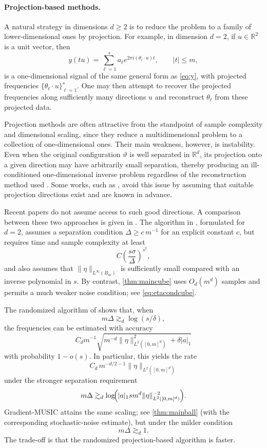 \documentclass[11pt]{article}
\theoremstyle{definition}
\numberwithin{theorem}{section}
\numberwithin{lemma}{section}
\numberwithin{equation}{section}
\def\R{\mathbb{R}}
\numberwithin{equation}{section}
\begin{document}
\paragraph{Projection-based methods.}
A natural strategy in dimensions $d\ge 2$ is to reduce the problem to a family of lower-dimensional ones by projection. For example, in dimension $d=2$, if $u\in\R^2$ is a unit vector, then
\[
y(tu)=\sum_{\ell=1}^s a_\ell e^{2\pi i (\theta_\ell\cdot u)t},
\qquad |t|\le m,
\]
is a one-dimensional signal of the same general form as \eqref{eq:y}, with projected frequencies $\{\theta_\ell\cdot u\}_{\ell=1}^s$. One may then attempt to recover the projected frequencies along sufficiently many directions $u$ and reconstruct $\theta_\ell$ from these projected data.

Projection methods are often attractive from the standpoint of sample complexity and dimensional scaling, since they reduce a multidimensional problem to a collection of one-dimensional ones. Their main weakness, however, is instability. Even when the original configuration $\vartheta$ is well separated in $\R^d$, its projection onto a given direction may have arbitrarily small separation, thereby producing an ill-conditioned one-dimensional inverse problem regardless of the reconstruction method used \cite{li2021stable,batenkov2021super}. Some works, such as \cite{cuyt2020sparse,mhaskar2025robust}, avoid this issue by assuming that suitable projection directions exist and are known in advance.

Recent papers \cite{chen2021algorithmic,jin2023super} do not assume access to such good directions. A comparison between these two approaches is given in \cite{jin2023super}. The algorithm in \cite{chen2021algorithmic}, formulated for $d=2$, assumes a separation condition $\Delta\ge c\,m^{-1}$ for an explicit constant $c$, but requires time and sample complexity at least
\[
C\left(\frac{s\sigma}{\Delta}\right)^{s^2},
\]
and also assumes that $\|\eta\|_{L^\infty(B_m)}$ is sufficiently small compared with an inverse polynomial in $s$. By contrast, \cref{thm:maincube} uses $O_d(m^d)$ samples and permits a much weaker noise condition; see \eqref{eq:etacondcube}.

The randomized algorithm of \cite{jin2023super} shows that, when
\[
m\Delta \gtrsim_d \log(s/\delta),
\]
the frequencies can be estimated with accuracy
\[
C_d m^{-1}\sqrt{m^{-d}\|\eta\|_{L^2([0,m]^d)}^2+\delta |a|_1}
\]
with probability $1-o(s)$. In particular, this yields the rate
\[
C_d\,m^{-d/2-1}\|\eta\|_{L^2([0,m]^d)}
\]
under the stronger separation requirement
\[
m\Delta \gtrsim_d \log\!\Bigl(|a|_1 s m^d \|\eta\|_{L^2([0,m]^d)}^{-2}\Bigr).
\]
Gradient-MUSIC attains the same scaling; see \cref{thm:mainball} (with the corresponding stochastic-noise estimate), but under the milder condition
\[
m\Delta\gtrsim_d 1.
\]
The trade-off is that the randomized projection-based algorithm is faster.
\end{document}
